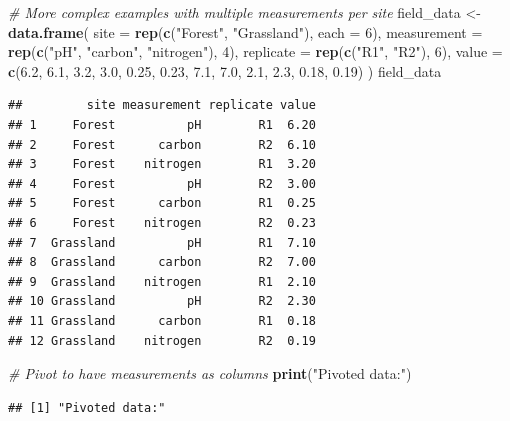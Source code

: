 \documentclass[
  10pt,
  b5paper,
  oneside]{book}
\newenvironment{Shaded}{\begin{snugshade}}{\end{snugshade}}
\newcommand{\AttributeTok}[1]{\textcolor[rgb]{0.13,0.29,0.53}{#1}}
\newcommand{\CommentTok}[1]{\textcolor[rgb]{0.56,0.35,0.01}{\textit{#1}}}
\newcommand{\DecValTok}[1]{\textcolor[rgb]{0.00,0.00,0.81}{#1}}
\newcommand{\FloatTok}[1]{\textcolor[rgb]{0.00,0.00,0.81}{#1}}
\newcommand{\FunctionTok}[1]{\textcolor[rgb]{0.13,0.29,0.53}{\textbf{#1}}}
\newcommand{\NormalTok}[1]{#1}
\newcommand{\OtherTok}[1]{\textcolor[rgb]{0.56,0.35,0.01}{#1}}
\newcommand{\StringTok}[1]{\textcolor[rgb]{0.31,0.60,0.02}{#1}}
\begin{document}
\begin{Shaded}
\begin{Highlighting}[]
\CommentTok{\# More complex examples with multiple measurements per site}
\NormalTok{field\_data }\OtherTok{\textless{}{-}} \FunctionTok{data.frame}\NormalTok{(}
 \AttributeTok{site =} \FunctionTok{rep}\NormalTok{(}\FunctionTok{c}\NormalTok{(}\StringTok{"Forest"}\NormalTok{, }\StringTok{"Grassland"}\NormalTok{), }\AttributeTok{each =} \DecValTok{6}\NormalTok{),}
 \AttributeTok{measurement =} \FunctionTok{rep}\NormalTok{(}\FunctionTok{c}\NormalTok{(}\StringTok{"pH"}\NormalTok{, }\StringTok{"carbon"}\NormalTok{, }\StringTok{"nitrogen"}\NormalTok{), }\DecValTok{4}\NormalTok{),}
 \AttributeTok{replicate =} \FunctionTok{rep}\NormalTok{(}\FunctionTok{c}\NormalTok{(}\StringTok{"R1"}\NormalTok{, }\StringTok{"R2"}\NormalTok{), }\DecValTok{6}\NormalTok{),}
 \AttributeTok{value =} \FunctionTok{c}\NormalTok{(}\FloatTok{6.2}\NormalTok{, }\FloatTok{6.1}\NormalTok{, }\FloatTok{3.2}\NormalTok{, }\FloatTok{3.0}\NormalTok{, }\FloatTok{0.25}\NormalTok{, }\FloatTok{0.23}\NormalTok{, }\FloatTok{7.1}\NormalTok{, }\FloatTok{7.0}\NormalTok{, }\FloatTok{2.1}\NormalTok{, }\FloatTok{2.3}\NormalTok{, }\FloatTok{0.18}\NormalTok{, }\FloatTok{0.19}\NormalTok{)}
\NormalTok{)}
\NormalTok{field\_data}
\end{Highlighting}
\end{Shaded}

\begin{verbatim}
##         site measurement replicate value
## 1     Forest          pH        R1  6.20
## 2     Forest      carbon        R2  6.10
## 3     Forest    nitrogen        R1  3.20
## 4     Forest          pH        R2  3.00
## 5     Forest      carbon        R1  0.25
## 6     Forest    nitrogen        R2  0.23
## 7  Grassland          pH        R1  7.10
## 8  Grassland      carbon        R2  7.00
## 9  Grassland    nitrogen        R1  2.10
## 10 Grassland          pH        R2  2.30
## 11 Grassland      carbon        R1  0.18
## 12 Grassland    nitrogen        R2  0.19
\end{verbatim}

\begin{Shaded}
\begin{Highlighting}[]
\CommentTok{\# Pivot to have measurements as columns}
\FunctionTok{print}\NormalTok{(}\StringTok{"Pivoted data:"}\NormalTok{)}
\end{Highlighting}
\end{Shaded}

\begin{verbatim}
## [1] "Pivoted data:"
\end{verbatim}
\end{document}
